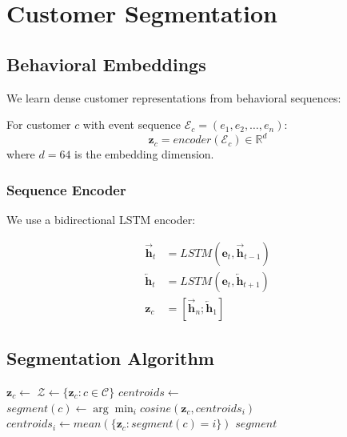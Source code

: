 \section{Customer Segmentation}


\subsection{Behavioral Embeddings}

We learn dense customer representations from behavioral sequences:

\begin{definition}
For customer $c$ with event sequence $\mathcal{E}_c = (e_1, e_2, \ldots, e_n)$:
\begin{equation}
\mathbf{z}_c = encoder(\mathcal{E}_c) \in \mathbb{R}^d
\end{equation}
where $d = 64$ is the embedding dimension.
\end{definition}

\subsubsection{Sequence Encoder}

We use a bidirectional LSTM encoder:

\begin{align}
\overrightarrow{\mathbf{h}}_t &= LSTM(\mathbf{e}_t, \overrightarrow{\mathbf{h}}_{t-1}) \\
\overleftarrow{\mathbf{h}}_t &= LSTM(\mathbf{e}_t, \overleftarrow{\mathbf{h}}_{t+1}) \\
\mathbf{z}_c &= [\overrightarrow{\mathbf{h}}_n; \overleftarrow{\mathbf{h}}_1]
\end{align}

\subsection{Segmentation Algorithm}

\begin{algorithm}
\caption{Behavioral Customer Segmentation}
\begin{algorithmic}[1]
    \State {}
        \State $\mathbf{z}_c \gets$ 
    \EndFor
    \State {}
    \State $\mathcal{Z} \gets \{\mathbf{z}_c : c \in \mathcal{C}\}$
    \State $centroids \gets$ 
    \Repeat
            \State $segment(c) \gets \arg\min_i cosine(\mathbf{z}_c, centroids_i)$
        \EndFor
            \State $centroids_i \gets mean(\{\mathbf{z}_c : segment(c) = i\})$
        \EndFor
    \State \Return $segment$
\EndFunction
\end{algorithmic}
\end{algorithm}

